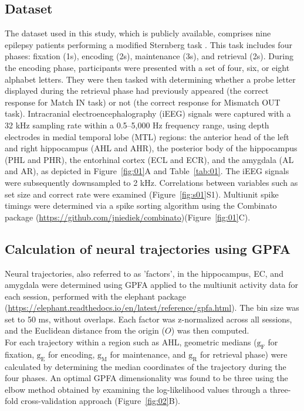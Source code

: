 \documentclass[final,3p,times,twocolumn]{elsarticle}
\begin{document}
\subsection{Dataset}
The dataset used in this study, which is publicly available, comprises nine epilepsy patients performing a modified Sternberg task \cite{boran_dataset_2020}. This task includes four phases: fixation (1s), encoding (2s), maintenance (3s), and retrieval (2s). During the encoding phase, participants were presented with a set of four, six, or eight alphabet letters. They were then tasked with determining whether a probe letter displayed during the retrieval phase had previously appeared (the correct response for Match IN task) or not (the correct response for Mismatch OUT task). Intracranial electroencephalography (iEEG) signals were captured with a 32 kHz sampling rate within a 0.5--5,000 Hz frequency range, using depth electrodes in medial temporal lobe (MTL) regions: the anterior head of the left and right hippocampus (AHL and AHR), the posterior body of the hippocampus (PHL and PHR), the entorhinal cortex (ECL and ECR), and the amygdala (AL and AR), as depicted in Figure~\ref{fig:01}A and Table~\ref{tab:01}. The iEEG signals were subsequently downsampled to 2 kHz. Correlations between variables such as set size and correct rate were examined (Figure~\ref{fig:s01}S1). Multiunit spike timings were determined via a spike sorting algorithm \cite{niediek_reliable_2016} using the Combinato package (\url{https://github.com/jniediek/combinato})(Figure~\ref{fig:01}C).

\subsection{Calculation of neural trajectories using GPFA}
Neural trajectories, also referred to as 'factors', in the hippocampus, EC, and amygdala were determined using GPFA \cite{yu_gaussian-process_2009} applied to the multiunit activity data for each session, performed with the elephant package (\url{https://elephant.readthedocs.io/en/latest/reference/gpfa.html}). The bin size was set to 50 ms, without overlaps. Each factor was z-normalized across all sessions, and the Euclidean distance from the origin ($O$) was then computed.
\\
\indent
For each trajectory within a region such as AHL, geometric medians ($\mathrm{g_{F}}$ for fixation, $\mathrm{g_{E}}$ for encoding, $\mathrm{g_{M}}$ for maintenance, and $\mathrm{g_{R}}$ for retrieval phase) were calculated by determining the median coordinates of the trajectory during the four phases. An optimal GPFA dimensionality was found to be three using the elbow method obtained by examining the log-likelihood values through a three-fold cross-validation approach (Figure~\ref{fig:02}B).
\end{document}
